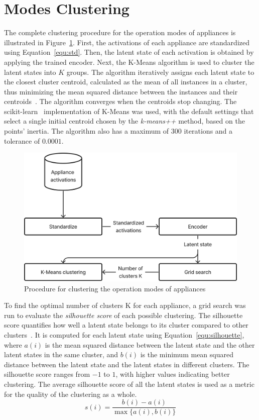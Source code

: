 \section{Modes Clustering}

The complete clustering procedure for the operation modes of appliances is illustrated in Figure~\ref{fig:clustering}. First, the activations of each appliance are standardized using Equation~\eqref{equ:std}. Then, the latent state of each activation is obtained by applying the trained encoder. Next, the K-Means algorithm is used to cluster the latent states into \(K\) groups. The algorithm iteratively assigns each latent state to the closest cluster centroid, calculated as the mean of all instances in a cluster, thus minimizing the mean squared distance between the instances and their centroids~\parencite{lloydLeastSquaresQuantization1982}. The algorithm converges when the centroids stop changing. The scikit-learn~\parencite*{pedregosaScikitlearnMachineLearning2011, buitinckAPIDesignMachine2013} implementation of K-Means was used, with the default settings that select a single initial centroid chosen by the \textit{k-means++} method, based on the points’ inertia. The algorithm also has a maximum of \(300\) iterations and a tolerance of \(0.0001\).

\begin{figure}
  \centering
  \includegraphics[width=.55\linewidth]{images/modes_clustering/clustering.png}
  \caption{Procedure for clustering the operation modes of appliances}%
  \label{fig:clustering}
\end{figure}

To find the optimal number of clusters K for each appliance, a grid search was run to evaluate the \textit{silhouette score} of each possible clustering. The silhouette score quantifies how well a latent state belongs to its cluster compared to other clusters~\parencite{rousseeuwSilhouettesGraphicalAid1987}. It is computed for each latent state using Equation~\eqref{equ:silhouette}, where \(a(i)\) is the mean squared distance between the latent state and the other latent states in the same cluster, and \(b(i)\) is the minimum mean squared distance between the latent state and the latent states in different clusters. The silhouette score ranges from \(-1\) to \(1\), with higher values indicating better clustering. The average silhouette score of all the latent states is used as a metric for the quality of the clustering as a whole.
\begin{equation}\label{equ:silhouette}
  s(i) = \frac{b(i) - a(i)}{\max{\{a(i), b(i)\}}}
\end{equation}

